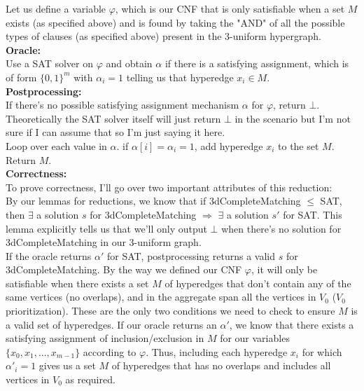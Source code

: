 \documentclass[11pt]{article}
\begin{document}
\begin{enumerate}
\begin{enumerate}
Let us define a variable $\varphi$, which is our CNF that is only satisfiable when a set $M$ exists (as specified above) and is found by taking the "AND" of all the possible types of clauses (as specified above) present in the 3-uniform hypergraph. \\


\textbf{Oracle: } \\

Use a SAT solver on $\varphi$ and obtain $\alpha$ if there is a satisfying assignment, which is of form $\{0,1\}^m$ with $\alpha_i = 1$ telling us that hyperedge $x_i \in M$. \\


\textbf{Postprocessing:} \\

If there's no possible satisfying assignment mechanism $\alpha$ for $\varphi$, return $\bot$. Theoretically the SAT solver itself will just return $\bot$ in the scenario but I'm not sure if I can assume that so I'm just saying it here. \\

Loop over each value in $\alpha$. if $\alpha[i] = \alpha_i = 1$, add hyperedge $x_i$ to the set $M$. \\

Return $M$. \\

\textbf{Correctness: } \\

To prove correctness, I'll go over two important attributes of this reduction: \\

By our lemmas for reductions, we know that if 3dCompleteMatching $\leq$ SAT, then $\exists$ a solution $s$ for 3dCompleteMatching $\Rightarrow$ $\exists$ a solution $s'$ for SAT. This lemma explicitly tells us that we'll only output $\bot$ when there's no solution for 3dCompleteMatching in our 3-uniform graph. \\

If the oracle returns $\alpha'$ for SAT, postprocessing returns a valid $s$ for 3dCompleteMatching. By the way we defined our CNF $\varphi$, it will only be satisfiable when there exists a set $M$ of hyperedges that don't contain any of the same vertices (no overlaps), and in the aggregate span all the vertices in $V_0$ ($V_0$ prioritization). These are the only two conditions we need to check to ensure $M$ is a valid set of hyperedges. If our oracle returns an $\alpha'$, we know that there exists a satisfying assignment of inclusion/exclusion in $M$ for our variables $\{x_0,x_1,...,x_{m-1}\}$ according to $\varphi$. Thus, including each hyperedge $x_i$ for which $\alpha'_i = 1$ gives us a set $M$ of hyperedges that has no overlaps and includes all vertices in $V_0$ as required. \\


\end{enumerate}
\end{enumerate}
\end{document}
